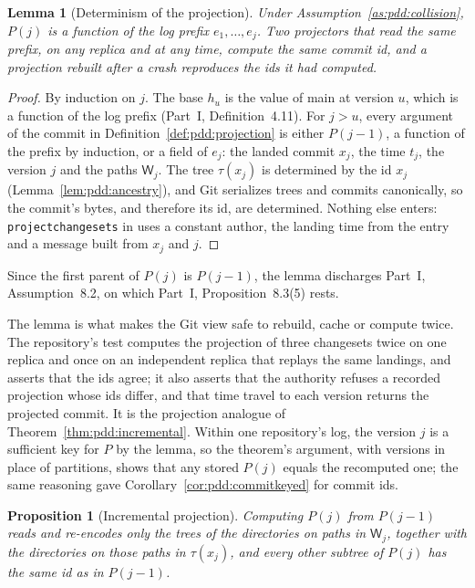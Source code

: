 \documentclass[11pt,letterpaper]{article}
\newtheorem{proposition}[theorem]{Proposition}
\newtheorem{lemma}[theorem]{Lemma}
\theoremstyle{definition}
\theoremstyle{remark}
\newcommand{\tree}{\tau}
\newcommand{\W}{\mathsf{W}}
\DeclareRobustCommand{\code}[1]{{\def\_{\textunderscore\allowbreak}\texttt{#1}}}
\begin{document}
\begin{lemma}[Determinism of the projection]
\label{lem:pdd:projection}
Under Assumption~\ref{as:pdd:collision}, $P(j)$ is a function of the log prefix $e_1,\ldots,e_j$. Two projectors that read the same prefix, on any replica and at any time, compute the same commit id, and a projection rebuilt after a crash reproduces the ids it had computed.
\end{lemma}

\begin{proof}
By induction on $j$. The base $h_u$ is the value of main at version $u$, which is a function of the log prefix (Part~I, Definition~4.11). For $j>u$, every argument of the commit in Definition~\ref{def:pdd:projection} is either $P(j-1)$, a function of the prefix by induction, or a field of $e_j$: the landed commit $x_j$, the time $t_j$, the version $j$ and the paths $\W_j$. The tree $\tree(x_j)$ is determined by the id $x_j$ (Lemma~\ref{lem:pdd:ancestry}), and Git serializes trees and commits canonically, so the commit's bytes, and therefore its id, are determined. Nothing else enters: \code{project\_changesets} in  uses a constant author, the landing time from the entry and a message built from $x_j$ and $j$.
\end{proof}

Since the first parent of $P(j)$ is $P(j-1)$, the lemma discharges Part~I, Assumption~8.2, on which Part~I, Proposition~8.3(5) rests.

The lemma is what makes the Git view safe to rebuild, cache or compute twice. The repository's test computes the projection of three changesets twice on one replica and once on an independent replica that replays the same landings, and asserts that the ids agree; it also asserts that the authority refuses a recorded projection whose ids differ, and that time travel to each version returns the projected commit. It is the projection analogue of Theorem~\ref{thm:pdd:incremental}. Within one repository's log, the version $j$ is a sufficient key for $P$ by the lemma, so the theorem's argument, with versions in place of partitions, shows that any stored $P(j)$ equals the recomputed one; the same reasoning gave Corollary~\ref{cor:pdd:commitkeyed} for commit ids.

\begin{proposition}[Incremental projection]
\label{prop:pdd:projectioncost}
Computing $P(j)$ from $P(j-1)$ reads and re-encodes only the trees of the directories on paths in $\W_j$, together with the directories on those paths in $\tree(x_j)$, and every other subtree of $P(j)$ has the same id as in $P(j-1)$.
\end{proposition}
\end{document}
